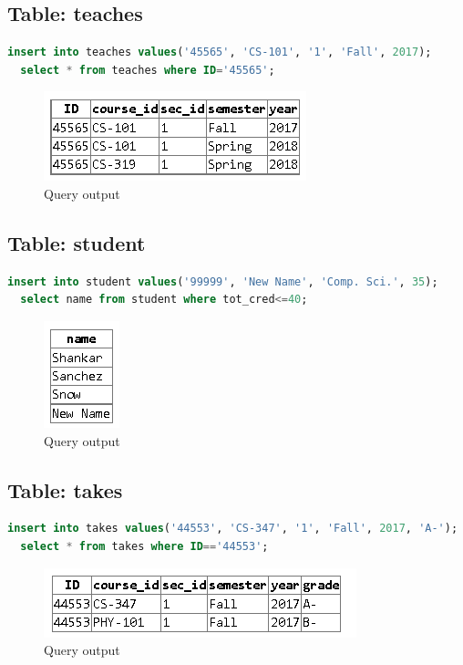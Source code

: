 \documentclass{article}
\begin{document}
\subsection{Table: teaches}
\begin{lstlisting}[language=sql]
  insert into teaches values('45565', 'CS-101', '1', 'Fall', 2017);
  select * from teaches where ID='45565';
\end{lstlisting}
\begin{figure}[!ht]
  \begin{center}
  \includegraphics[scale=1]{teaches.png}
  \caption{Query output}
  \end{center}
\end{figure}

\subsection{Table: student}
\begin{lstlisting}[language=sql]
  insert into student values('99999', 'New Name', 'Comp. Sci.', 35);
  select name from student where tot_cred<=40;
\end{lstlisting}
\begin{figure}[!ht]
  \begin{center}
  \includegraphics[scale=1]{student.png}
  \caption{Query output}
  \end{center}
\end{figure}

\subsection{Table: takes}
\begin{lstlisting}[language=sql]
  insert into takes values('44553', 'CS-347', '1', 'Fall', 2017, 'A-');
  select * from takes where ID=='44553';
\end{lstlisting}
\begin{figure}[!ht]
  \begin{center}
  \includegraphics[scale=1]{takes.png}
  \caption{Query output}
  \end{center}
\end{figure}
\end{document}
